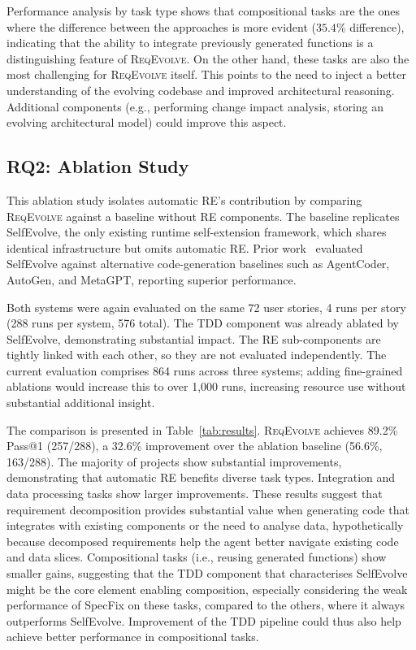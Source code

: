 \documentclass[sigconf,screen]{acmart}
\begin{document}
Performance analysis by task type shows that compositional tasks are the ones where the difference between the approaches is more evident  ($35.4$\% difference), indicating that the ability to integrate previously generated functions is a distinguishing feature of \textsc{ReqEvolve}. On the other hand, these tasks are also the most challenging for \textsc{ReqEvolve} itself. This points to the need to inject a better understanding of the evolving codebase and improved architectural reasoning. Additional components (e.g., performing change impact analysis, storing an evolving architectural model) could improve this aspect.

\subsection{RQ2: Ablation Study}
This ablation study isolates automatic RE's contribution by comparing \textsc{ReqEvolve} against a baseline without RE components. The baseline replicates SelfEvolve, the only existing runtime self-extension framework, which shares identical infrastructure but omits automatic RE. Prior work~\cite{fahim2026selfevolve} evaluated SelfEvolve against alternative code-generation baselines such as AgentCoder, AutoGen, and MetaGPT, reporting superior performance.

Both systems were again evaluated on the same 72 user stories, 4 runs per story (288 runs per system, 576 total). The TDD component was already ablated by SelfEvolve, demonstrating substantial impact. The RE sub-components are tightly linked with each other, so they are not evaluated independently. The current evaluation comprises 864 runs across three systems; adding fine-grained ablations would increase this to over 1,000 runs, increasing resource use without substantial additional insight.

The comparison is presented in Table~\ref{tab:results}. \textsc{ReqEvolve} achieves 89.2\% Pass@1 (257/288), a 32.6\% improvement over the ablation baseline (56.6\%, 163/288). The majority of projects show substantial improvements, demonstrating that automatic RE benefits diverse task types. Integration and data processing tasks show larger improvements. These results suggest that requirement decomposition provides substantial value when generating code that integrates with existing components or the need to analyse data, hypothetically because decomposed requirements help the agent better navigate existing code and data slices. Compositional tasks (i.e., reusing generated functions) show smaller gains, suggesting that the TDD component that characterises SelfEvolve might be the core element enabling composition, especially considering the weak performance of SpecFix on these tasks, compared to the others, where it always outperforms SelfEvolve. Improvement of the TDD pipeline could thus also help achieve better performance in compositional tasks.
\end{document}
